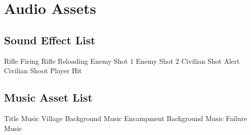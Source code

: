 \documentclass[11pt,fleqn]{book} %
\begin{document}

\chapter{Audio Assets}

\section{Sound Effect List}
\begin{outline}
	\1 Rifle Firing
	\1 Rifle Reloading
	\1 Enemy Shot 1
	\1 Enemy Shot 2
	\1 Civilian Shot Alert
	\1 Civilian Shoot
	\1 Player Hit
\end{outline}

\section{Music Asset List}
\begin{outline}
	\1 Title Music
	\1 Village Background Music
	\1 Encampment Background Music
	\1 Failure Music
\end{outline}


%


%
\end{document}

